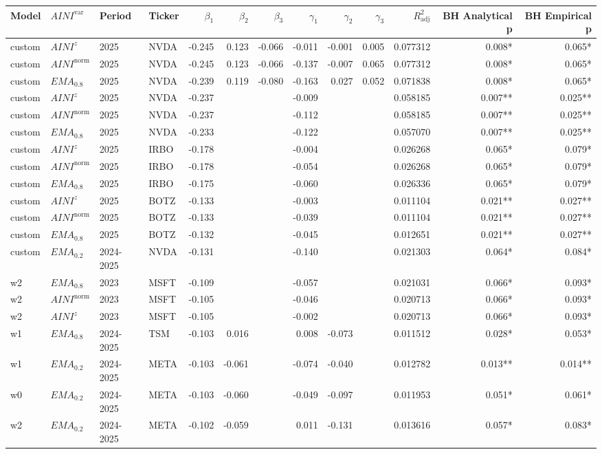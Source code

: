 \setlength\tabcolsep{2.0pt}
\scriptsize

\begin{tabular}{@{}llllrrrrrrrrr@{}}
\toprule
Model & $AINI^{\mathrm{var}}$ & Period & Ticker & $\beta_{1}$ & $\beta_{2}$ & $\beta_{3}$ & $\gamma_{1}$ & $\gamma_{2}$ & $\gamma_{3}$ & $R^{2}_{\mathrm{adj}}$ & BH Analytical p & BH Empirical p \\
\midrule
custom & $AINI^{z}$ & 2025 & NVDA & -0.245 & 0.123 & -0.066 & -0.011 & -0.001 & 0.005 & 0.077312 & 0.008* & 0.065* \\
custom & $AINI^{\mathrm{norm}}$ & 2025 & NVDA & -0.245 & 0.123 & -0.066 & -0.137 & -0.007 & 0.065 & 0.077312 & 0.008* & 0.065* \\
custom & $EMA_{0.8}$ & 2025 & NVDA & -0.239 & 0.119 & -0.080 & -0.163 & 0.027 & 0.052 & 0.071838 & 0.008* & 0.065* \\
custom & $AINI^{z}$ & 2025 & NVDA & -0.237 &  &  & -0.009 &  &  & 0.058185 & 0.007** & 0.025** \\
custom & $AINI^{\mathrm{norm}}$ & 2025 & NVDA & -0.237 &  &  & -0.112 &  &  & 0.058185 & 0.007** & 0.025** \\
custom & $EMA_{0.8}$ & 2025 & NVDA & -0.233 &  &  & -0.122 &  &  & 0.057070 & 0.007** & 0.025** \\
custom & $AINI^{z}$ & 2025 & IRBO & -0.178 &  &  & -0.004 &  &  & 0.026268 & 0.065* & 0.079* \\
custom & $AINI^{\mathrm{norm}}$ & 2025 & IRBO & -0.178 &  &  & -0.054 &  &  & 0.026268 & 0.065* & 0.079* \\
custom & $EMA_{0.8}$ & 2025 & IRBO & -0.175 &  &  & -0.060 &  &  & 0.026336 & 0.065* & 0.079* \\
custom & $AINI^{z}$ & 2025 & BOTZ & -0.133 &  &  & -0.003 &  &  & 0.011104 & 0.021** & 0.027** \\
custom & $AINI^{\mathrm{norm}}$ & 2025 & BOTZ & -0.133 &  &  & -0.039 &  &  & 0.011104 & 0.021** & 0.027** \\
custom & $EMA_{0.8}$ & 2025 & BOTZ & -0.132 &  &  & -0.045 &  &  & 0.012651 & 0.021** & 0.027** \\
custom & $EMA_{0.2}$ & 2024-2025 & NVDA & -0.131 &  &  & -0.140 &  &  & 0.021303 & 0.064* & 0.084* \\
w2 & $EMA_{0.8}$ & 2023 & MSFT & -0.109 &  &  & -0.057 &  &  & 0.021031 & 0.066* & 0.093* \\
w2 & $AINI^{\mathrm{norm}}$ & 2023 & MSFT & -0.105 &  &  & -0.046 &  &  & 0.020713 & 0.066* & 0.093* \\
w2 & $AINI^{z}$ & 2023 & MSFT & -0.105 &  &  & -0.002 &  &  & 0.020713 & 0.066* & 0.093* \\
w1 & $EMA_{0.8}$ & 2024-2025 & TSM & -0.103 & 0.016 &  & 0.008 & -0.073 &  & 0.011512 & 0.028* & 0.053* \\
w1 & $EMA_{0.2}$ & 2024-2025 & META & -0.103 & -0.061 &  & -0.074 & -0.040 &  & 0.012782 & 0.013** & 0.014** \\
w0 & $EMA_{0.2}$ & 2024-2025 & META & -0.103 & -0.060 &  & -0.049 & -0.097 &  & 0.011953 & 0.051* & 0.061* \\
w2 & $EMA_{0.2}$ & 2024-2025 & META & -0.102 & -0.059 &  & 0.011 & -0.131 &  & 0.013616 & 0.057* & 0.083* \\
\bottomrule
\end{tabular}
